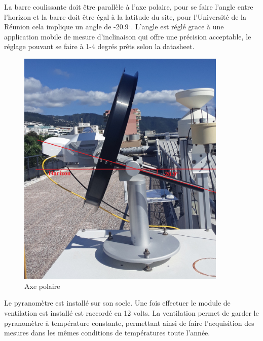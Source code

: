 \documentclass[12pt,a4paper]{article}
\begin{document}
\begin{flushleft}
La barre coulissante doit être parallèle à l'axe polaire, pour se faire l'angle entre l'horizon et la barre doit être égal à la latitude du site, pour l'Université de la Réunion cela implique un angle de -20.9$^\circ$. L'angle est réglé grace à une application mobile de mesure d'inclinaison qui offre une précision acceptable, le réglage pouvant se faire à 1-4 degrés prêts selon la datasheet.

\begin{figure}[H]
\centering
\includegraphics[width=10cm]{image/montage/3.jpg} 
\caption{Axe polaire}
\end{figure}


Le pyranomètre est installé sur son socle. Une fois effectuer le module de ventilation est installé est raccordé en 12 volts. La ventilation permet de garder le pyranomètre à température constante, permettant ainsi de faire l'acquisition des mesures dans les mêmes conditions de températures toute l'année.


\end{flushleft}
\end{document}
